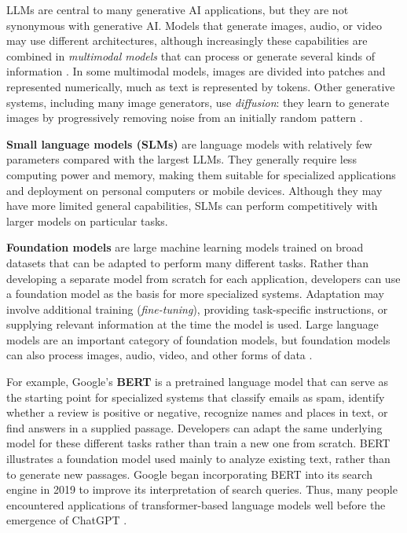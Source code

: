 \documentclass[11pt]{article}
\begin{document}
LLMs are central to many generative AI applications, but they are
not synonymous with generative AI. Models that generate images,
audio, or video may use different architectures, although
increasingly these capabilities are combined in \emph{multimodal
models} that can process or generate several kinds of information
\citep{Bommasani2021}.
In some multimodal models, images are divided into patches and represented
numerically, much as text is represented by tokens. Other generative
systems, including many image generators, use \emph{diffusion}: they learn
to generate images by progressively removing noise from an initially
random pattern \citep{Ho2020Diffusion}.

\textbf{Small language models (SLMs)} are language models with relatively few parameters compared with the largest LLMs. They generally require less computing power and memory, making them suitable for specialized applications and deployment on personal computers or mobile devices. Although they may have more limited general capabilities, SLMs can perform competitively with larger models on particular tasks.

\textbf{Foundation models} are large machine learning models
trained on broad datasets that can be adapted to perform many
different tasks. Rather than developing a separate model from
scratch for each application, developers can use a foundation
model as the basis for more specialized systems. Adaptation
may involve additional training (\emph{fine-tuning}), providing
task-specific instructions, or supplying relevant information
at the time the model is used. Large language models are an
important category of foundation models, but foundation
models can also process images, audio, video, and other forms
of data \citep{Bommasani2021}.

For example, Google's \textbf{BERT} \citep{Devlin2019BERT} is a pretrained language model that can
serve as the starting point for specialized systems that classify
emails as spam, identify whether a review is positive or negative,
recognize names and places in text, or find answers in a supplied
passage. Developers can adapt the same underlying model for these
different tasks rather than train a new one from scratch. BERT
illustrates a foundation model used mainly to analyze existing
text, rather than to generate new passages.
Google began incorporating BERT into its search engine in 2019 to improve its interpretation of search queries. Thus, many people encountered applications of transformer-based language models well before the emergence of ChatGPT \citep{Google2019BERTSearch}.
\end{document}
